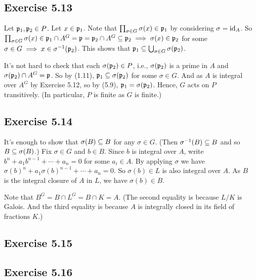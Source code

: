 \documentclass[../A&M.tex]{subfiles}
\begin{document}
\subsection*{Exercise 5.13}

Let $\mathfrak{p}_1,\mathfrak{p}_2 \in P$. Let $x\in \mathfrak{p}_1$. Note that $\prod_{\sigma \in G} \sigma(x) \in \mathfrak{p}_1$ by considering $\sigma = \operatorname{id}_A$. So $\prod_{\sigma \in G} \sigma(x) \in \mathfrak{p}_1 \cap A^G = \mathfrak{p} = \mathfrak{p}_2 \cap A^G \subseteq \mathfrak{p}_2 \implies \sigma(x) \in \mathfrak{p}_2$ for some $\sigma \in G \implies x \in \sigma^{-1}(\mathfrak{p}_2)$. This shows that $\mathfrak{p}_1 \subseteq \bigcup_{\sigma \in G} \sigma(\mathfrak{p}_2)$.

It's not hard to check that each $\sigma(\mathfrak{p}_2) \in P$, i.e., $\sigma(\mathfrak{p}_2)$ is a prime in $A$ and $\sigma(\mathfrak{p}_2) \cap A^G = \mathfrak{p}$. So by (1.11), $\mathfrak{p}_1 \subseteq \sigma(\mathfrak{p}_2)$ for some $\sigma \in G$. And as $A$ is integral over $A^G$ by Exercise 5.12, so by (5.9), $\mathfrak{p}_1 = \sigma(\mathfrak{p}_2)$. Hence, $G$ acts on $P$ transitively. (In particular, $P$ is finite as $G$ is finite.)

\subsection*{Exercise 5.14}

It's enough to show that $\sigma(B) \subseteq B$ for any $\sigma \in G$. (Then $\sigma^{-1}(B) \subseteq B$ and so $B \subseteq \sigma(B)$.) Fix $\sigma\in G$ and $b\in B$. Since $b$ is integral over $A$, write $b^n + a_1b^{n-1} + \cdots + a_n = 0$ for some $a_i\in A$. By applying $\sigma$ we have $\sigma(b)^n + a_1\sigma(b)^{n-1} + \cdots + a_n = 0$. So $\sigma(b) \in L$ is also integral over $A$. As $B$ is the integral closure of $A$ in $L$, we have $\sigma(b) \in B$.

Note that $B^G = B \cap L^G = B \cap K = A$. (The second equality is because $L/K$ is Galois. And the third equality is because $A$ is integrally closed in its field of fractions $K$.)

\subsection*{Exercise 5.15}

\subsection*{Exercise 5.16}
\end{document}
